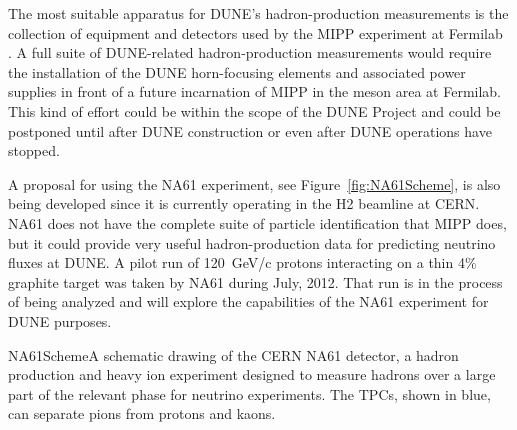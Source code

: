 The most suitable apparatus for DUNE's hadron-production measurements
is the collection of equipment and detectors used by the MIPP experiment at Fermilab~
\cite{Isenhower:2006zp}.   
A full suite of DUNE-related
hadron-production measurements would require the installation of the DUNE horn-focusing
elements and associated power supplies in front of a future
incarnation of MIPP in the meson area at Fermilab.
This kind of effort could be within the scope of the DUNE Project and could be postponed
until after DUNE construction or even after DUNE operations have
stopped. 

A proposal for using the NA61 experiment, see Figure~\ref{fig:NA61Scheme}, 
is also being developed since it is currently operating
in the H2 beamline at CERN. NA61 does not have the complete suite of particle identification that MIPP does, but it could provide very useful hadron-production data for predicting neutrino fluxes at DUNE.
A pilot run of 120~GeV/c protons interacting on a thin 4\% graphite target 
was taken by NA61 during July, 2012. That run is in the process of being analyzed and will explore the capabilities of the NA61 experiment for DUNE purposes. 

\begin{cdrfigure}{NA61Scheme}{A schematic drawing of the CERN NA61 detector, a hadron production and heavy ion experiment 
designed to measure hadrons over a large part of the relevant phase for 
neutrino experiments. The TPCs, shown in blue, can separate pions from protons and kaons.}
\end{cdrfigure}
